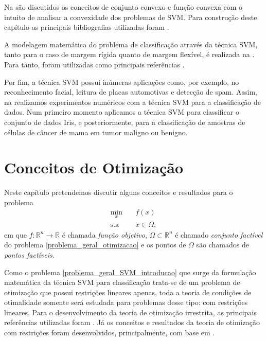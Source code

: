 \documentclass[12pt,a4paper]{scrartcl}
\def\RR{\mathds{R}}
\theoremstyle{definition}%
\begin{document}
Na  são discutidos os conceitos de conjunto convexo e função convexa com o intuito de analisar a convexidade dos problemas de SVM. Para construção deste capítulo as principais bibliografias utilizadas foram \textcite{Ademir2013,Izmailov2014ac,luenberger2008linear,bertsekas2016nonlinear}.

A modelagem matemática do problema de classificação através da técnica SVM, tanto para o caso de margem rígida quanto de margem flexível, é realizada na . Para tanto, foram utilizadas como principais referências \textcite{Evelin2017,Faisal2019}.

Por fim, a técnica SVM possui inúmeras aplicações como, por exemplo, no reconhecimento facial, leitura de placas automotivas e detecção de spam. Assim, na  realizamos experimentos numéricos com a técnica SVM para a classificação de dados. Num primeiro momento aplicamos a técnica SVM para classificar o conjunto de dados Iris, e posteriormente, para a classificação de amostras de células de câncer de mama em tumor maligno ou benigno. 







\newpage
\section{Conceitos de Otimização} \label{chap:conceitos_de_otimizacao}

Neste capítulo pretendemos discutir alguns conceitos e resultados para o problema 
\[ \label{problema_geral_otimizacao}
\begin{aligned}
\min_{x} & \quad f(x) \\
\text{s.a} & \quad x \in \Omega ,
\end{aligned}
\]
em que $f: \RR^{n} \rightarrow \RR$ é chamada \emph{função objetivo}, $\Omega \subset \RR^{n}$ é chamado \emph{conjunto factível} do problema \eqref{problema_geral_otimizacao} e os pontos de $\Omega$ são chamados de \emph{pontos factíveis}. 

Como o problema \eqref{problema_geral_SVM_introducao} que surge da formulação matemática da técnica SVM para classificação trata-se de um problema de otimização que possui restrições lineares apenas, toda a teoria de condições de otimalidade somente será estudada para problemas desse tipo: com restrições lineares. Para o desenvolvimento da teoria de otimização irrestrita, as principais referências utilizadas foram \textcite{Izmailov2014ac,Ademir2013}. Já os conceitos e resultados da teoria de otimização com restrições foram desenvolvidos, principalmente, com base em \textcite{Ana1994,luenberger2008linear}.  
\end{document}
